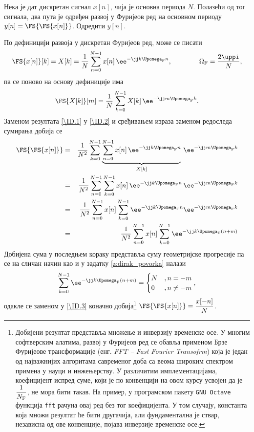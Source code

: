 \PID
Нека је дат дискретан сигнал $x[n]$, чија је основна периода $N$. Полазећи од тог сигнала, два пута је одређен развој у Фуријеов ред на 
основном периоду $y[n] = \FS{\FS{x[n]}}$. Одредити $y[n]$. 

\RESENJE
По дефиницији развоја у дискретан Фуријеов ред, може се писати 
\begin{equation}
    \FS{x[n]}[k] = X[k] = \dfrac{1}{N} \sum_{n = 0}^{N-1} x[n] \, \ee^{-\jj k \Upomega_{\rm F} n}, \qquad\qquad \Omega_{\rm F} = \dfrac{2\uppi}{N},
    \label{\ID.1}
\end{equation}
па се поново на основу дефиниције има 
\begin{eqnarray}
    \FS{X[k]}[m] = \dfrac{1}{N} \sum_{k = 0}^{N-1} X[k] \, \ee^{-\jj m \Upomega_{\rm F} k}. \label{\ID.2}
\end{eqnarray}
Заменом резултата \eqref{\ID.1} у \eqref{\ID.2} и сређивањем израза заменом редоследа сумирања добија се 
\begin{eqnarray}
    \FS{\FS{x[n]}} 
    &=&
    \dfrac{1}{N^2} 
    \sum_{k = 0}^{N-1} 
    \underbrace{ \sum_{n = 0}^{N-1} x[n] \, \ee^{-\jj k \Upomega_{\rm F} n} }_{X[k]}
    \, \ee^{-\jj m \Upomega_{\rm F} k}
    \\ 
    &=& 
    \dfrac{1}{N^2} 
    \sum_{n = 0}^{N-1}
    \sum_{k = 0}^{N-1} 
    x[n] \, \ee^{-\jj k \Upomega_{\rm F} n} 
    \, \ee^{-\jj m \Upomega_{\rm F} k} \\
    &=& 
    \dfrac{1}{N^2} 
    \sum_{n = 0}^{N-1}
    x[n]
    \sum_{k = 0}^{N-1} 
    \ee^{-\jj k \Upomega_{\rm F} n} 
    \ee^{-\jj m \Upomega_{\rm F} k}
    \\
    &=& 
    \dfrac{1}{N^2} 
    \sum_{n = 0}^{N-1}
    x[n]
    \sum_{k = 0}^{N-1} 
    \ee^{-\jj k \Upomega_{\rm F} (n + m)} \label{\ID.3}
\end{eqnarray}
Добијена сума у последњем кораку представља суму геометријске прогресије па се на сличан начин као и у задатку
\ref{z:dirak_povorka} налази
\begin{equation}
    \sum_{k = 0}^{N-1} 
    \ee^{-\jj k \Upomega_{\rm F} (n + m)}  
    = 
    \begin{cases}
        N &, n = -m \\
        0 &, n \neq -m
    \end{cases},
\end{equation}
одакле се заменом у \eqref{\ID.3} коначно добија\footnote{Добијени резултат 
представља множење и инверзију временске осе. У многим софтверским алатима, развој у Фуријеов ред се обавља 
применом Брзе Фуријеове трансформације (енг. \textit{FFT -- Fast Fourier Transofrm}) која је један од најважнијих алгоритама савременог
доба са веома широким спектром примена у науци и инжењерству. 
У различитим имплементацијама, коефицијент испред суме, који је по конвенцији 
на овом курсу усвојен да је $\dfrac{1}{N_{\rm F}}$,  не мора бити такав. 
На пример, у програмском пакету \texttt{GNU Octave} функција \texttt{fft} рачуна 
овај ред без тог коефицијента. У том случају, константа која множи резултат ће бити другачија, 
али фундаментална је ствар, независна од ове конвенције, појава инверзије временске осе.} $\FS{\FS{x[n]}} = \dfrac{x[-n]}{N}$. 

